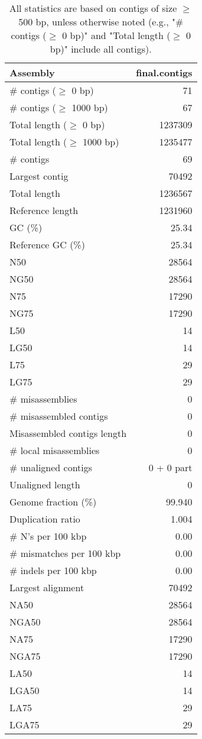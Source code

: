 \documentclass[12pt,a4paper]{article}
\begin{document}
\begin{table}[ht]
\begin{center}
\caption{All statistics are based on contigs of size $\geq$ 500 bp, unless otherwise noted (e.g., "\# contigs ($\geq$ 0 bp)" and "Total length ($\geq$ 0 bp)" include all contigs).}
\begin{tabular}{|l*{1}{|r}|}
\hline
Assembly & final.contigs \\ \hline
\# contigs ($\geq$ 0 bp) & 71 \\ \hline
\# contigs ($\geq$ 1000 bp) & 67 \\ \hline
Total length ($\geq$ 0 bp) & 1237309 \\ \hline
Total length ($\geq$ 1000 bp) & 1235477 \\ \hline
\# contigs & 69 \\ \hline
Largest contig & 70492 \\ \hline
Total length & 1236567 \\ \hline
Reference length & 1231960 \\ \hline
GC (\%) & 25.34 \\ \hline
Reference GC (\%) & 25.34 \\ \hline
N50 & 28564 \\ \hline
NG50 & 28564 \\ \hline
N75 & 17290 \\ \hline
NG75 & 17290 \\ \hline
L50 & 14 \\ \hline
LG50 & 14 \\ \hline
L75 & 29 \\ \hline
LG75 & 29 \\ \hline
\# misassemblies & 0 \\ \hline
\# misassembled contigs & 0 \\ \hline
Misassembled contigs length & 0 \\ \hline
\# local misassemblies & 0 \\ \hline
\# unaligned contigs & 0 + 0 part \\ \hline
Unaligned length & 0 \\ \hline
Genome fraction (\%) & 99.940 \\ \hline
Duplication ratio & 1.004 \\ \hline
\# N's per 100 kbp & 0.00 \\ \hline
\# mismatches per 100 kbp & 0.00 \\ \hline
\# indels per 100 kbp & 0.00 \\ \hline
Largest alignment & 70492 \\ \hline
NA50 & 28564 \\ \hline
NGA50 & 28564 \\ \hline
NA75 & 17290 \\ \hline
NGA75 & 17290 \\ \hline
LA50 & 14 \\ \hline
LGA50 & 14 \\ \hline
LA75 & 29 \\ \hline
LGA75 & 29 \\ \hline
\end{tabular}
\end{center}
\end{table}
\end{document}
